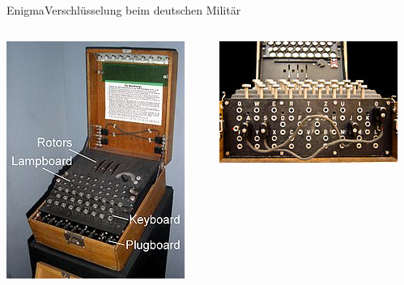 \documentclass{beamer}
\theoremstyle{plain}
\begin{document}
  \begin{frame}{Enigma}{Verschlüsselung beim deutschen Militär}
    \begin{columns}
    \begin{column}{0.3\textwidth}
  \includegraphics[width=\textwidth]{enigma_maschine}   
    \end{column}
  \begin{column}{0.3\textwidth}
  \includegraphics[width=\textwidth]{enigma_stecker}   

\end{column}
\end{columns}
\end{frame}
\end{document}
